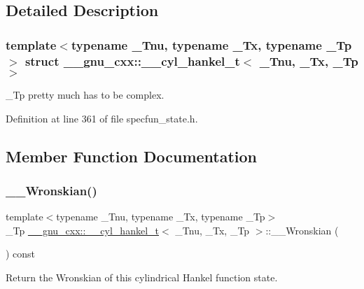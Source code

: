 \subsection{Detailed Description}
\subsubsection*{template$<$typename \+\_\+\+Tnu, typename \+\_\+\+Tx, typename \+\_\+\+Tp$>$\newline
struct \+\_\+\+\_\+gnu\+\_\+cxx\+::\+\_\+\+\_\+cyl\+\_\+hankel\+\_\+t$<$ \+\_\+\+Tnu, \+\_\+\+Tx, \+\_\+\+Tp $>$}

\+\_\+\+Tp pretty much has to be complex. 

Definition at line 361 of file specfun\+\_\+state.\+h.



\subsection{Member Function Documentation}
\mbox{\label{struct____gnu__cxx_1_1____cyl__hankel__t_a8a41c4698706cb51006f2d8ebb5d8053}} 
\subsubsection{\texorpdfstring{\+\_\+\+\_\+\+Wronskian()}{\_\_Wronskian()}}
{\footnotesize\ttfamily template$<$typename \+\_\+\+Tnu, typename \+\_\+\+Tx, typename \+\_\+\+Tp$>$ \\
\+\_\+\+Tp \hyperlink{struct____gnu__cxx_1_1____cyl__hankel__t}{\+\_\+\+\_\+gnu\+\_\+cxx\+::\+\_\+\+\_\+cyl\+\_\+hankel\+\_\+t}$<$ \+\_\+\+Tnu, \+\_\+\+Tx, \+\_\+\+Tp $>$\+::\+\_\+\+\_\+\+Wronskian (\begin{DoxyParamCaption}{ }\end{DoxyParamCaption}) const\hspace{0.3cm}{\ttfamily [inline]}}



Return the Wronskian of this cylindrical Hankel function state. 



